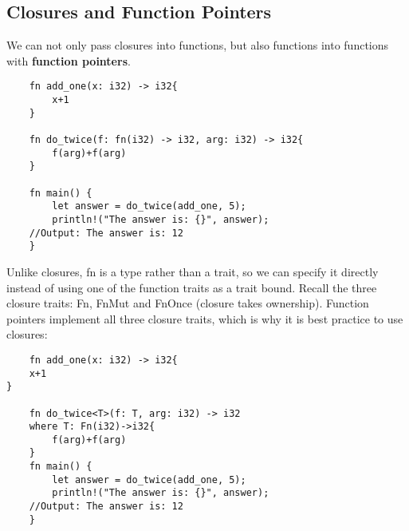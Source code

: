 \subsection{Closures and Function Pointers}
\begin{definition}
    We can not only pass closures into functions, but also functions into functions with \textbf{function pointers}.

    \begin{lstlisting}
    fn add_one(x: i32) -> i32{
        x+1
    }

    fn do_twice(f: fn(i32) -> i32, arg: i32) -> i32{
        f(arg)+f(arg)
    }

    fn main() {
        let answer = do_twice(add_one, 5);
        println!("The answer is: {}", answer);
    //Output: The answer is: 12       
    }
\end{lstlisting}
\end{definition}
Unlike closures, fn is a type rather than a trait, so we can specify it directly instead of using one of the function traits as a trait bound. Recall the three closure traits: Fn, FnMut and FnOnce (closure takes ownership). 
Function pointers implement all three closure traits, which is why it is best practice to use closures: 

\begin{lstlisting}
    fn add_one(x: i32) -> i32{
    x+1
}

    fn do_twice<T>(f: T, arg: i32) -> i32
    where T: Fn(i32)->i32{
        f(arg)+f(arg)
    }
    fn main() {
        let answer = do_twice(add_one, 5);
        println!("The answer is: {}", answer);
    //Output: The answer is: 12       
    }
\end{lstlisting}

